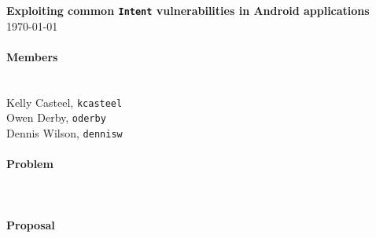 \documentclass[12pt,a4paper,draft]{article}
\begin{document}
\flushleft\textbf{Exploiting common \texttt{Intent} vulnerabilities in Android %
applications}\\
\today\\

\paragraph{Members} ~\\

Kelly Casteel, \texttt{kcasteel}\\
Owen Derby, \texttt{oderby}\\
Dennis Wilson, \texttt{dennisw}\\

\paragraph{Problem} ~\\

\paragraph{Proposal} ~\\
\end{document}
